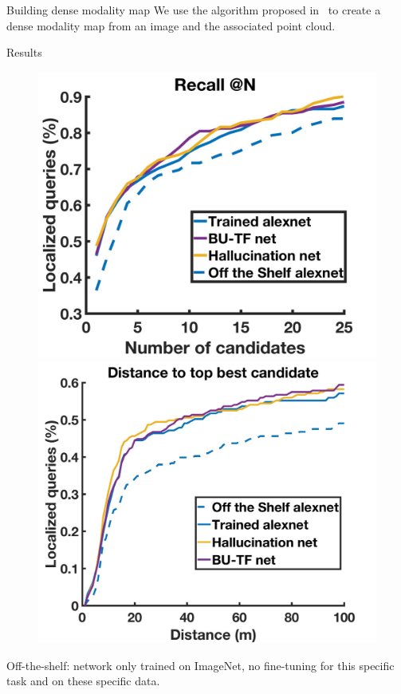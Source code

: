 \begin{frame}{Building dense modality map}
	We use the algorithm proposed in~\cite{Bevilacqua2017} to create a dense modality map from an image and the associated point cloud.
\end{frame}

\begin{frame}{Results}
	\begin{figure}[t]
		\centering %
		\includegraphics[width=0.499\linewidth]{images/global_res/recall2.jpg}\hfill
		\includegraphics[width=0.499\linewidth]{images/global_res/dist2.jpg}			
	\end{figure}	
	Off-the-shelf: network only trained on ImageNet, no fine-tuning for this specific task and on these specific data.
\end{frame}

